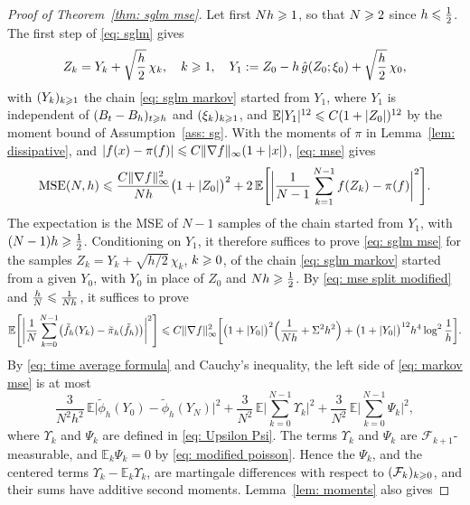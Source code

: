 \begin{proof}[Proof of Theorem~\ref{thm: sglm mse}]
    Let first $Nh \geqslant 1$, so that $N \geqslant 2$ since $h \leqslant \frac12$. The first step of \eqref{eq: sglm} gives
    \begin{equation*}
        Z_k = Y_k + \sqrt{\frac h2}\,\chi_k , \quad k \geqslant 1 , \quad Y_1 := Z_0 - h\, \hat g(Z_0;\xi_0) + \sqrt{\frac h2}\,\chi_0 ,
    \end{equation*}
    with $(Y_k)_{k \geqslant 1}$ the chain \eqref{eq: sglm markov} started from $Y_1$, where $Y_1$ is independent of $(B_t - B_h)_{t \geqslant h}$ and $(\xi_k)_{k \geqslant 1}$, and $\mathbb E |Y_1|^{12} \leqslant C (1 + |Z_0|)^{12}$ by the moment bound of Assumption~\ref{ass: sg}. With the moments of $\pi$ in Lemma~\ref{lem: dissipative}, and $|f(x) - \pi(f)| \leqslant C \lVert \nabla f \rVert_\infty (1 + |x|)$, \eqref{eq: mse} gives
    \begin{equation*}
        \mathrm{MSE}(N,h) \leqslant \frac{C \lVert \nabla f \rVert_\infty^2}{Nh} \bigl( 1+|Z_0| \bigr)^2 + 2\, \mathbb E \Biggl[ \biggl| \frac{1}{N-1} \sum_{k=1}^{N-1} f(Z_k) - \pi(f) \biggr|^2 \Biggr] .
    \end{equation*}
    The expectation is the MSE of $N-1$ samples of the chain started from $Y_1$, with $(N-1)h \geqslant \frac12$. Conditioning on $Y_1$, it therefore suffices to prove \eqref{eq: sglm mse} for the samples $Z_k = Y_k + \sqrt{h/2}\,\chi_k$, $k \geqslant 0$, of the chain \eqref{eq: sglm markov} started from a given $Y_0$, with $Y_0$ in place of $Z_0$ and $Nh \geqslant \frac12$. By \eqref{eq: mse split modified} and $\frac{h}{N} \leqslant \frac{1}{Nh}$, it suffices to prove
    \begin{equation}
        \mathbb E \Biggl[ \biggl| \frac1N \sum_{k=0}^{N-1} \bigl( \tilde f_h(Y_k) - \tilde\pi_h(\tilde f_h) \bigr) \biggr|^2 \Biggr] \leqslant C \lVert \nabla f \rVert_\infty^2 \biggl[ \bigl( 1 + |Y_0| \bigr)^2 \Bigl( \frac{1}{Nh} + \Sigma^2 h^2 \Bigr) + \bigl( 1 + |Y_0| \bigr)^{12} h^4 \log^2\frac1h \biggr] .
        \label{eq: markov mse}
    \end{equation}
    By \eqref{eq: time average formula} and Cauchy's inequality, the left side of \eqref{eq: markov mse} is at most
    \begin{equation}
        \frac{3}{N^2h^2}\, \mathbb E\bigl| \tilde\phi_h(Y_0) - \tilde\phi_h(Y_N) \bigr|^2
        + \frac{3}{N^2}\, \mathbb E\biggl| \sum_{k=0}^{N-1} \Upsilon_k \biggr|^2
        + \frac{3}{N^2}\, \mathbb E\biggl| \sum_{k=0}^{N-1} \Psi_k \biggr|^2 ,
        \label{eq: three terms}
    \end{equation}
    where $\Upsilon_k$ and $\Psi_k$ are defined in \eqref{eq: Upsilon Psi}. The terms $\Upsilon_k$ and $\Psi_k$ are $\mathcal F_{k+1}$-measurable, and $\mathbb E_k \Psi_k = 0$ by \eqref{eq: modified poisson}. Hence the $\Psi_k$, and the centered terms $\Upsilon_k - \mathbb E_k \Upsilon_k$, are martingale differences with respect to $(\mathcal F_k)_{k \geqslant 0}$, and their sums have additive second moments. Lemma~\ref{lem: moments} also gives

\end{proof}
